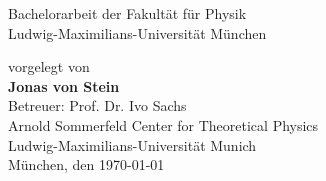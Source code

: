 \documentclass[a4paper,11pt,twoside,openright]{report}
\newcommand{\authorname}{Jonas von Stein}
\newcommand{\thesisdate}{\today}
\begin{document}
\begin{titlepage}
\begin{center}
    \vspace*{0.5cm}
    \Large
    Bachelorarbeit der Fakultät für Physik\\
    Ludwig-Maximilians-Universität München

    \vspace*{3.5cm}
    \large
    vorgelegt von\\[0.1cm]
    \Large \textbf{\authorname}\\

    \vfill
    \large
    Betreuer: Prof. Dr. Ivo Sachs\\[0.1cm]
    Arnold Sommerfeld Center for Theoretical Physics \\ Ludwig-Maximilians-Universität Munich\\
    \vspace*{1.5cm}
    München, den \thesisdate
  \end{center}
\end{titlepage}


\cleardoublepage
{}
\tableofcontents
\clearpage


\pagestyle{fancy}
\fancyhf{} %


\lhead[\fancyplain{}{\thepage}]{\fancyplain{}{\rightmark}}

\rhead[\fancyplain{}{\leftmark}]{\fancyplain{}{\thepage}}

\cfoot{}



\clearpage{\pagestyle{empty}\cleardoublepage}


\clearpage{\pagestyle{empty}\cleardoublepage}


\clearpage{\pagestyle{empty}\cleardoublepage}


\clearpage{\pagestyle{empty}\cleardoublepage}


\clearpage{\pagestyle{empty}\cleardoublepage}


\clearpage{\pagestyle{empty}\cleardoublepage}


\clearpage{\pagestyle{empty}\cleardoublepage}


\clearpage


\cleardoublepage
{}


\end{document}
